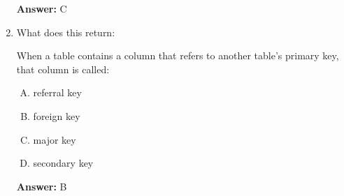 \documentclass[12pt]{article}
\begin{document}
\begin{enumerate}[1.]
    \bigskip

    \textbf{Answer:} C

    \item

    What does this return:

    \bigskip

    When a table contains a column that refers to another table's primary key,
    that column is called:

    \bigskip

    \begin{enumerate}[A.]
        \item referral key
        \item foreign key
        \item major key
        \item secondary key
    \end{enumerate}

    \bigskip

    \textbf{Answer:} B


\end{enumerate}
\end{document}
